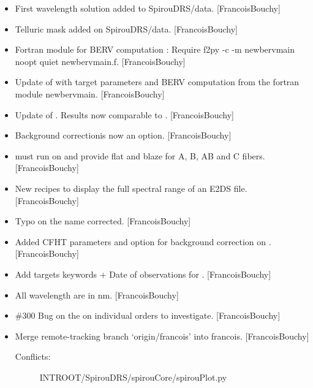 \documentclass[a4paper,10pt,english]{report}
\begin{document}
\begin{itemize}
\begin{description}
\end{description}

\item {} 
First wavelength solution added to SpirouDRS/data. {[}FrancoisBouchy{]}

\item {} 
Telluric mask added on SpirouDRS/data. {[}FrancoisBouchy{]}

\item {} 
Fortran module for BERV computation : Require f2py -c -m newbervmain
\textendash{}noopt \textendash{}quiet newbervmain.f. {[}FrancoisBouchy{]}

\item {} 
Update of  with target parameters and BERV computation
from the fortran module newbervmain. {[}FrancoisBouchy{]}

\item {} 
Update of . Results now comparable to
. {[}FrancoisBouchy{]}

\item {} 
Background correctionis now an option. {[}FrancoisBouchy{]}

\item {} 
 must run on  and provide flat and blaze for
A, B, AB and C fibers. {[}FrancoisBouchy{]}

\item {} 
New recipes to display the full spectral range of an E2DS file.
{[}FrancoisBouchy{]}

\item {} 
Typo on the name corrected. {[}FrancoisBouchy{]}

\item {} 
Added CFHT parameters and option for background correction on
. {[}FrancoisBouchy{]}

\item {} 
Add targets keywords + Date of observations for .
{[}FrancoisBouchy{]}

\item {} 
All wavelength are in nm. {[}FrancoisBouchy{]}

\item {} 
\#300 Bug on the  on individual orders to investigate.
{[}FrancoisBouchy{]}

\item {} 
Merge remote-tracking branch ‘origin/francois’ into francois.
{[}FrancoisBouchy{]}
\begin{description}
\item[{Conflicts:}] \leavevmode
INTROOT/SpirouDRS/spirouCore/spirouPlot.py


\end{description}
\end{itemize}
\end{document}
